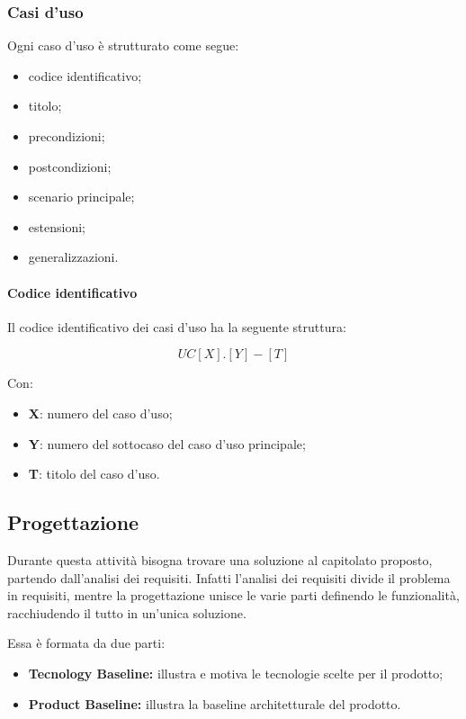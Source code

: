 \subsubsection{Casi d'uso}

Ogni caso d'uso è strutturato come segue:
\begin{itemize}
    \item codice identificativo;
    \item titolo;
    \item precondizioni;
    \item postcondizioni;
    \item scenario principale;
    \item estensioni;
    \item generalizzazioni.
\end{itemize}

\paragraph{Codice identificativo} Il codice identificativo dei casi d'uso ha la seguente struttura:

\[UC[X].[Y]-[T]\]

Con:
\begin{itemize}
    \item \textbf{X}: numero del caso d'uso;
    \item \textbf{Y}: numero del sottocaso del caso d'uso principale;
    \item \textbf{T}: titolo del caso d'uso.
\end{itemize}

\subsection{Progettazione}
Durante questa attività bisogna trovare una soluzione al capitolato proposto, partendo dall'analisi dei requisiti. Infatti l'analisi dei requisiti divide il problema in requisiti, mentre la progettazione unisce le varie parti definendo le funzionalità, racchiudendo il tutto in un'unica soluzione.

Essa è formata da due parti:
\begin{itemize}
    \item \textbf{Tecnology Baseline:} illustra e motiva le tecnologie scelte per il prodotto;
    \item \textbf{Product Baseline:} illustra la baseline architetturale del prodotto.
\end{itemize}

